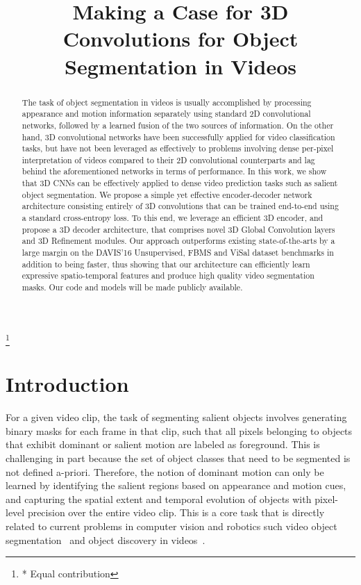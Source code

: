 \documentclass{bmvc2k_arxiv}
\title{Making a Case for 3D Convolutions for Object Segmentation in Videos}
\newcommand\blfootnote[1]{\begingroup
  \renewcommand\thefootnote{}\footnote{#1}\addtocounter{footnote}{-1}\endgroup
}
\begin{document}
\maketitle

\blfootnote{* Equal contribution}

\begin{abstract}
The task of object segmentation in videos is usually accomplished by processing appearance and motion information separately using standard 2D convolutional networks, followed by a learned fusion of the two sources of information.
On the other hand, 3D convolutional networks have been successfully applied for video classification tasks, but have not been leveraged as effectively to problems involving dense per-pixel interpretation of videos compared to their 2D convolutional counterparts and lag behind the aforementioned networks in terms of performance. 
In this work, we show that 3D CNNs can be effectively applied to dense video prediction tasks such as salient object segmentation. We propose a simple yet effective encoder-decoder network architecture consisting entirely of 3D convolutions that can be trained end-to-end using a standard cross-entropy loss. 
    To this end, we leverage an efficient 3D encoder, and propose a 3D decoder architecture, that comprises novel 3D Global Convolution layers and 3D Refinement modules. Our approach outperforms existing state-of-the-arts by a large margin on the DAVIS'16 Unsupervised, FBMS and ViSal dataset benchmarks in addition to being faster, thus showing that our architecture can efficiently learn expressive spatio-temporal features and produce high quality video segmentation masks. Our code and models will be made publicly available.
\end{abstract}

\section{Introduction}
\label{sec:intro}

For a given video clip, the task of segmenting salient objects involves generating binary masks for each frame in that clip, such that all pixels belonging to objects that exhibit dominant or salient motion are labeled as foreground. 
This is challenging in part because the set of object classes that need to be segmented is not defined a-priori. Therefore, the notion of dominant motion can only be learned by identifying the salient regions based on appearance and motion cues, and capturing the spatial extent and temporal evolution of objects with pixel-level precision over the entire video clip.
This is a core task that is directly related to current problems in computer vision and robotics such video object segmentation~\cite{Perazzi16CVPR,PontTuset17arxiv} and object discovery in videos~\cite{Xiao16CVPR, Osep19ICRA, Wang14ECCV, Kwak15ICCV}.
\end{document}
